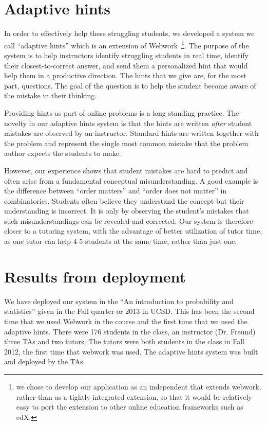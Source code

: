 \documentclass{sigchi}
\begin{document}
\section{Adaptive hints}
In order to effectively help these struggling students, we developed a
system we call ``adaptive hints'' which is an extension of
Webwork~\footnote{we chose to develop our application as an
  independent that extends webwork, rather than as a tightly
  integrated extension, so that it would be relatively easy to port
  the extension to other online education frameworks such as
  edX.}. The purpose of the system is to help instructors identify
struggling students in real time, identify their closest-to-correct
answer, and send them a personalized hint that would help them in a
productive direction. The hints that we give are, for the most part,
questions. The goal of the question is to help the student become
aware of the mistake in their thinking.

Providing hints as part of online problems is a long standing
practice. The novelty in our adaptive hints system is that the hints 
are written {\em after} student mistakes are observed by an instructor.
Standard hints are written together with the problem and represent the
single most common mistake that the problem author expects the
students to make.

However, our experience shows that student mistakes are hard to
predict and often arise from a fundamental conceptual
misunderstanding. A good example is the difference between ``order
matters'' and ``order does not matter'' in combinatorics.
Students often believe they understand the concept but their
understanding is incorrect. It is only by observing the student's 
mistakes that such misunderstandings can be revealed and corrected.
Our system is therefore closer to a tutoring system, with the advantage
of better utilization of tutor time, as one tutor can help 4-5
students at the same time, rather than just one.

\section{Results from deployment}
We have deployed our system in the ``An introduction to probability and
statistics'' given in the Fall quarter or 2013 in UCSD. This has been
the second time that we used Webwork in the course and the first time
that we used the adaptive hints. There were 176 students in the class,
an instructor (Dr. Freund) three TAs and two tutors. The tutors were
both students in the class in Fall 2012, the first time that webwork
was used. The adaptive hints system was built and deployed by the TAs.
\end{document}
